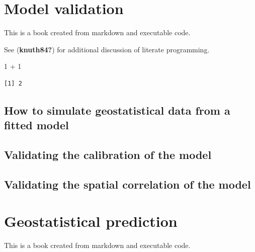 \documentclass[
  letterpaper,
]{krantz}
\newenvironment{Shaded}{\begin{snugshade}}{\end{snugshade}}
\newcommand{\DecValTok}[1]{\textcolor[rgb]{0.68,0.00,0.00}{#1}}
\newcommand{\SpecialCharTok}[1]{\textcolor[rgb]{0.37,0.37,0.37}{#1}}
\begin{document}

\hypertarget{model-validation}{%
\chapter{Model validation}\label{model-validation}}

This is a book created from markdown and executable code.

See (\textbf{knuth84?}) for additional discussion of literate
programming.

\begin{Shaded}
\begin{Highlighting}[]
\DecValTok{1} \SpecialCharTok{+} \DecValTok{1}
\end{Highlighting}
\end{Shaded}

\begin{verbatim}
[1] 2
\end{verbatim}

\hypertarget{how-to-simulate-geostatistical-data-from-a-fitted-model}{%
\section{How to simulate geostatistical data from a fitted
model}\label{how-to-simulate-geostatistical-data-from-a-fitted-model}}

\hypertarget{validating-the-calibration-of-the-model}{%
\section{Validating the calibration of the
model}\label{validating-the-calibration-of-the-model}}

\hypertarget{validating-the-spatial-correlation-of-the-model}{%
\section{Validating the spatial correlation of the
model}\label{validating-the-spatial-correlation-of-the-model}}


\hypertarget{geostatistical-prediction}{%
\chapter{Geostatistical prediction}\label{geostatistical-prediction}}

This is a book created from markdown and executable code.
\end{document}
